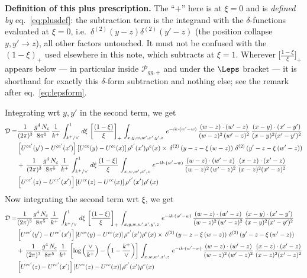\documentclass[9pt]{article}
\numberwithin{equation}{section}
\begin{document}
{\color{red}\textbf{Definition of this plus prescription.} The ``$+$'' here is at
$\xi=0$ and is \emph{defined by} eq.~\eqref{eq:plusdef}: the subtraction term is the integrand
with the $\delta$-functions evaluated at $\xi=0$, i.e.\ $\delta^{(2)}(y-z)\delta^{(2)}(y'-z)$
(the position collapse $y,y'\to z$), all other factors untouched. It must not be confused with
the $(1-\xi)_{+}$ used elsewhere in this note, which subtracts at $\xi=1$. Wherever
$\big[\frac{1-\xi}{\xi}\big]_{+}$ appears below --- in particular inside
$\mathcal P_{gg,+}$ and under the $\Leps$ bracket --- it is shorthand for exactly this
$\delta$-form subtraction and nothing else; see the remark after eq.~\eqref{eq:lepsform}.}

Integrating wrt $y,y'$ in the second term, we get
\begin{align}
    \mathcal{D} = & \frac{1}{(2\pi)^{3}}\frac{g^{4}\,N_{c}}{8\pi^{5}}\,\frac{1}{k^{+}}\,\int_{k^{+}/\vee}^{1}\,d\xi\,\left[\frac{(1-\xi)}{\xi}\right]_{+}\,\int_{x,y,w,w',x',y',z}\,e^{-ik\cdot(w'-w)}\,\frac{(w-z)\cdot (w'-z)}{(w-z)^{2}\, (w'-z)^{2}}\,\frac{(x-y)\cdot(x'-y')}{(x-y)^{2}(x'-y')^{2}}\notag \\ &\left[U^{ce'}(y')-U^{ce'}(x')\right]\left[U^{ce}(y)-U^{ce}(x)\right]\rho^{e'}(x')\rho^{e}(x)\times\,\delta^{(2)}\left(y-z-\xi\,(w-z)\right)\, \delta^{(2)}\left(y'-z-\xi\,(w'-z)\right)\notag \\ & +\,\frac{1}{(2\pi)^{3}}\frac{g^{4}\,N_{c}}{8\pi^{5}}\,\frac{1}{k^{+}}\,\int_{k^{+}/\vee}^{1}\,d\xi\,\frac{(1-\xi)}{\xi}\,\int_{x,w,w',x',z}\,e^{-ik\cdot(w'-w)}\,\frac{(w-z)\cdot (w'-z)}{(w-z)^{2}\, (w'-z)^{2}}\,\frac{(x-z)\cdot(x'-z)}{(x-z)^{2}(x'-z)^{2}}\notag \\ & \left[U^{ce'}(z)-U^{ce'}(x')\right]\left[U^{ce}(z)-U^{ce}(x)\right]\rho^{e'}(x')\rho^{e}(x)
\end{align}
Now integrating the second term wrt $\xi$, we get
\begin{align}
    \mathcal{D} = & \frac{1}{(2\pi)^{3}}\frac{g^{4}\,N_{c}}{8\pi^{5}}\,\frac{1}{k^{+}}\,\int_{k^{+}/\vee}^{1}\,d\xi\,\left[\frac{(1-\xi)}{\xi}\right]_{+}\,\int_{x,y,w,w',x',y',z}\,e^{-ik\cdot(w'-w)}\,\frac{(w-z)\cdot (w'-z)}{(w-z)^{2}\, (w'-z)^{2}}\,\frac{(x-y)\cdot(x'-y')}{(x-y)^{2}(x'-y')^{2}}\notag \\ &\left[U^{ce'}(y')-U^{ce'}(x')\right]\left[U^{ce}(y)-U^{ce}(x)\right]\rho^{e'}(x')\rho^{e}(x)\times\,\delta^{(2)}\left(y-z-\xi\,(w-z)\right)\, \delta^{(2)}\left(y'-z-\xi\,(w'-z)\right)\notag \\ & +\,\frac{1}{(2\pi)^{3}}\frac{g^{4}\,N_{c}}{8\pi^{5}}\,\frac{1}{k^{+}}\,\left[\log{\left(\frac{\vee}{k^{+}}\right)} - \left(1-\frac{k^{+}}{\vee}\right)\right]\,\int_{x,w,w',x',z}\,e^{-ik\cdot(w'-w)}\,\frac{(w-z)\cdot (w'-z)}{(w-z)^{2}\, (w'-z)^{2}}\,\frac{(x-z)\cdot(x'-z)}{(x-z)^{2}(x'-z)^{2}}\notag \\ & \left[U^{ce'}(z)-U^{ce'}(x')\right]\left[U^{ce}(z)-U^{ce}(x)\right]\rho^{e'}(x')\rho^{e}(x)
\end{align}
\end{document}
